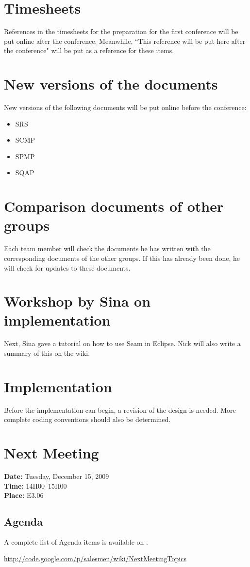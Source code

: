 \documentclass[a4paper, 12pt]{article}
\begin{document}
	\section{Timesheets}
References in the timesheets for the preparation for the first conference will be put online after the conference. Meanwhile, ``This reference will be put here after the conference" will be put as a reference for these items.

	\section{New versions of the documents}
New versions of the following documents will be put online before the conference:
		\begin{itemize}
			\item SRS
			\item SCMP
			\item SPMP
			\item SQAP
		\end{itemize}
		
	\section{Comparison documents of other groups}
Each team member will check the documents he has written with the corresponding documents of the other groups. If this has already been done, he will check for updates to these documents.

	\section{Workshop by Sina on implementation}
Next, Sina gave a tutorial on how to use Seam in Eclipse. Nick will also write a summary of this on the wiki. 

	\section{Implementation}
Before the implementation can begin, a revision of the design is needed. More complete coding conventions should also be determined.	
	
	\section{Next Meeting}

		\textbf{Date:} Tuesday, December 15, 2009\\
		\textbf{Time:} 14H00--15H00\\
		\textbf{Place:} E3.06\\
	
		\subsection{Agenda}
A complete list of Agenda items is available on \cite{site6}.\\
	
	\begin{thebibliography}{99}
		\href{http://code.google.com/p/salesmen/wiki/NextMeetingTopics}{http://code.google.com/p/salesmen/wiki/NextMeetingTopics}

		
	\end{thebibliography}	
		
\end{document}
